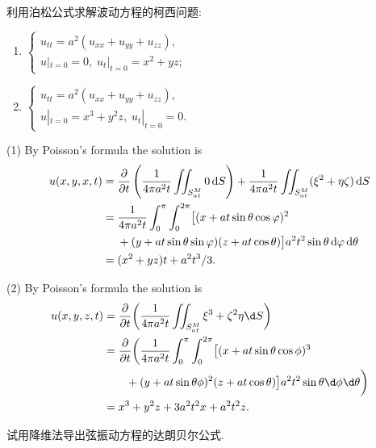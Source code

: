 \begin{exercise}
  利用泊松公式求解波动方程的柯西问题:
  \begin{enumerate}[(1)]
    \item $\begin{cases}
            u_{tt} = a^2(u_{xx}+u_{yy}+u_{zz}), \\
            u|_{t=0}=0,\; u_t|_{t=0}=x^2+yz;
          \end{cases}$
    \item $\begin{cases}
            u_{tt} = a^2(u_{xx}+u_{yy}+u_{zz}), \\
            u|_{t=0}=x^3+y^2z,\; u_t|_{t=0}=0.
           \end{cases}$
  \end{enumerate}
\end{exercise}

\begin{solve}
  (1) By Poisson's formula the solution is
  \begin{align*}
    u(x,y,x,t)
    ={} & \frac{\partial}{\partial t}\left(\frac{1}{4\pi a^2t}\iint_{S_{at}^M}0\mathop{}\!\mathrm{d} S\right)
          + \frac{1}{4\pi a^2t}\iint_{S_{at}^M}(\xi^2+\eta\zeta)\mathop{}\!\mathrm{d} S \\
    ={} & \frac{1}{4\pi a^2t}\int_0^{\pi}\int_0^{2\pi} \bigl[(x+at\sin\theta\cos\varphi)^2 \\
        & + (y+at\sin\theta\sin\varphi)(z+at\cos\theta) \bigr]
          a^2t^2\sin\theta\mathop{}\!\mathrm{d}\varphi\mathop{}\!\mathrm{d}\theta \\
    ={} & (x^2+	yz)t + a^2t^3/3.
  \end{align*}

  (2) By Poisson's formula the solution is
  \begin{align*}
    u(x,y,z,t)
    & = \frac{\partial}{\partial t} \biggl(\frac{1}{4\pi a^2 t}\iint_{S_{at}^M} \xi^3
        + \zeta^2\eta \d S\biggr) \\
    & = \frac{\partial}{\partial t} \biggl(\frac{1}{4\pi a^2 t} \int_0^\pi \int_0^{2\pi}
        \bigl[ (x+at\sin\theta\cos\phi)^3 \\
    & \qquad + (y+at\sin\theta\phi)^2(z+at\cos\theta) \bigr] 
        a^2t^2\sin\theta \d \phi \d \theta\biggr) \\
    & = x^3 + y^2z + 3a^2t^2x + a^2t^2z.
  \end{align*}
\end{solve}


\begin{exercise}
  试用降维法导出弦振动方程的达朗贝尔公式.
\end{exercise}

